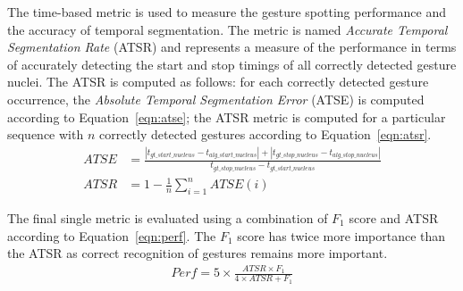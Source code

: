 The time-based metric is used to measure the gesture spotting performance and
the accuracy of temporal segmentation. The metric is named \textit{Accurate
Temporal Segmentation Rate} (ATSR) and represents a measure of the performance
in terms of accurately detecting the start and stop timings of all correctly
detected gesture nuclei. The ATSR is computed as follows: for each correctly detected gesture
occurrence, the \textit{Absolute Temporal Segmentation Error} (ATSE) is computed
according to Equation~\ref{eqn:atse}; the ATSR metric is computed for a
particular sequence with $n$ correctly detected gestures according to
Equation~\ref{eqn:atsr}.
\begin{align}
ATSE &= \frac{|t_{gt\_start\_nucleus} - t_{alg\_start\_nucleus}| +
|t_{gt\_stop\_nucleus} - t_{alg\_stop\_nucleus}|}{t_{gt\_stop\_nucleus} -
t_{gt\_start\_nucleus}} \label{eqn:atse} \\
ATSR &= 1 - \frac{1}{n}\sum_{i=1}^nATSE(i)
\label{eqn:atsr}
\end{align}

The final single metric is evaluated using a combination of $F_1$ score and ATSR
according to Equation~\ref{eqn:perf}. The $F_1$ score has twice more importance
than the ATSR as correct recognition of gestures remains more important.
\begin{align}
Perf = 5\times \frac{ATSR\times F_1}{4\times ATSR + F_1}\label{eqn:perf}
\end{align}
